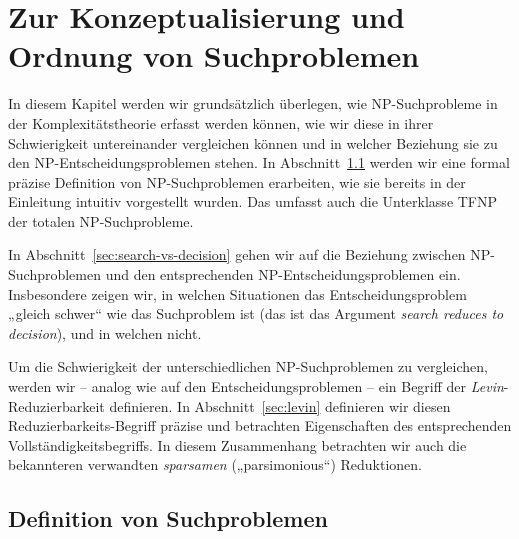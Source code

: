 \chapter{Zur Konzeptualisierung und Ordnung von Suchproblemen}\label{chap:searchproblems}

In diesem Kapitel werden wir grundsätzlich überlegen, wie NP-Suchprobleme in der Komplexitätstheorie erfasst werden können, wie wir diese in ihrer Schwierigkeit untereinander vergleichen können und in welcher  Beziehung sie zu den NP-Entscheidungsproblemen stehen.
In Abschnitt~\ref{sec:searchproblems-def} werden wir eine formal präzise Definition von NP-Suchproblemen erarbeiten, wie sie bereits in der Einleitung intuitiv vorgestellt wurden. Das umfasst auch die Unterklasse TFNP der totalen NP-Suchprobleme.

In Abschnitt~\ref{sec:search-vs-decision} gehen wir auf die Beziehung zwischen NP-Suchproblemen und den entsprechenden NP-Entscheidungsproblemen ein. Insbesondere zeigen wir, in welchen Situationen das Entscheidungsproblem „gleich schwer“ wie das Suchproblem ist (das ist das Argument \emph{search reduces to decision}), und in welchen nicht.

Um die Schwierigkeit der unterschiedlichen NP-Suchproblemen zu vergleichen, werden wir – analog wie auf den Entscheidungsproblemen – ein Begriff der \emph{Levin}-Reduzierbarkeit definieren. In Abschnitt~\ref{sec:levin} definieren wir diesen Reduzierbarkeits-Begriff präzise und betrachten Eigenschaften des entsprechenden Vollständigkeitsbegriffs.
In diesem Zusammenhang betrachten wir auch die bekannteren verwandten \emph{sparsamen} („parsimonious“) Reduktionen.

\section{Definition von Suchproblemen}\label{sec:searchproblems-def}

